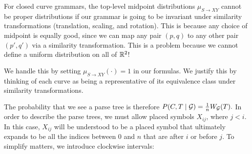 
\begin{rmk}
  For closed curve grammars, the top-level midpoint distributions
  $\mu_{S\to XY}$ cannot be proper distributions if our grammar is
  going to be invariant under similarity transformations (translation,
  scaling, and rotation). This is because any choice of midpoint is
  equally good, since we can map any pair $(p,q)$ to any other pair
  $(p',q')$ via a similarity transformation. This is a problem
  because we cannot define a uniform distribution on all of $\mathbb{R}^2$!

  We handle this by setting $\mu_{S\to XY}(\cdot) = 1$ in our
  formulas. We justify this by thinking of each curve as being a
  representative of its equivalence class under similarity
  transformations.  
\end{rmk}

The probability that we see a parse tree is therefore $P(C,T\mid {\mathcal G})
= \frac{1}{n} W_{{\mathcal G}}(T).$ In order to describe the parse trees, we
must allow placed symbols $X_{ij}$, where $j<i$. In this case,
$X_{ij}$ will be understood to be a placed symbol that ultimately
expands to be all the indices between $0$ and $n$ that are after $i$
or before $j$. To simplify matters, we introduce clockwise intervals:


